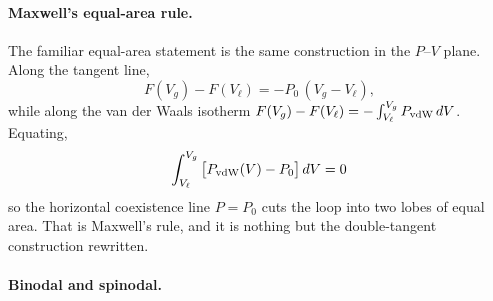 \documentclass[10pt,a4paper]{article}
\theoremstyle{remark}
\begin{document}
\paragraph{Maxwell's equal-area rule.}

The familiar equal-area statement is the same construction in the $P$--$V$ plane.
Along the tangent line,
\[
F(V_g)-F(V_\ell)=-P_0\,(V_g-V_\ell),
\]
while along the van der Waals isotherm
$F(V_g)-F(V_\ell)=-\int_{V_\ell}^{V_g}P_{\rm vdW}\,dV$. Equating,
\[
\;\int_{V_\ell}^{V_g}\big[P_{\rm vdW}(V)-P_0\big]\,dV=0\
\]
so the horizontal coexistence line $P=P_0$ cuts the loop into two lobes of equal
area. That is Maxwell's rule, and it is nothing but the double-tangent
construction rewritten.

\paragraph{Binodal and spinodal.}
\end{document}
